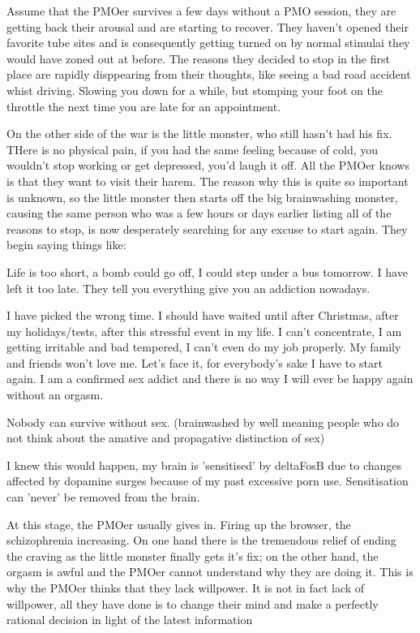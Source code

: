 Assume that the PMOer survives a few days without a PMO session, they are getting back their arousal and are starting to recover. They haven't opened their favorite tube sites and is consequently getting turned on by normal stimulai they would have zoned out at before. The reasons they decided to stop in the first place are rapidly disppearing from their thoughts, like seeing a bad road accident whist driving. Slowing you down for a while, but stomping your foot on the throttle the next time you are late for an appointment.

On the other side of the war is the little monster, who still hasn't had his fix. THere is no physical pain, if you had the same feeling because of cold, you wouldn't stop working or get depressed, you'd laugh it off. All the PMOer knows is that they want to visit their harem. The reason why this is quite so important is unknown, so the little monster then starts off the big brainwashing monster, causing the same person who was a few hours or days earlier listing all of the reasons to stop, is now desperately searching for any excuse to start again. They begin saying things like:

  Life is too short, a bomb could go off, I could step under a bus tomorrow. I have left it too late. They tell you everything give you an addiction nowadays.

  I have picked the wrong time. I should have waited until after Christmas, after my holidays/tests, after this stressful event in my life. I can't concentrate, I am getting irritable and bad tempered, I can't even do my job properly. My family and friends won't love me. Let's face it, for everybody's sake I have to start again. I am a confirmed sex addict and there is no way I will ever be happy again without an orgasm.

  Nobody can survive without sex. (brainwashed by well meaning people who do not think about the amative and propagative distinction of sex)

  I knew this would happen, my brain is 'sensitised' by deltaFosB due to changes affected by dopamine surges because of my past excessive porn use. Sensitisation can 'never' be removed from the brain.

At this stage, the PMOer usually gives in. Firing up the browser, the schizophrenia increasing. On one hand there is the tremendous relief of ending the craving as the little monster finally gets it's fix; on the other hand, the orgasm is awful and the PMOer cannot understand why they are doing it. This is why the PMOer thinks that they lack willpower. It is not in fact lack of willpower, all they have done is to change their mind and make a perfectly rational decision in light of the latest information
  
